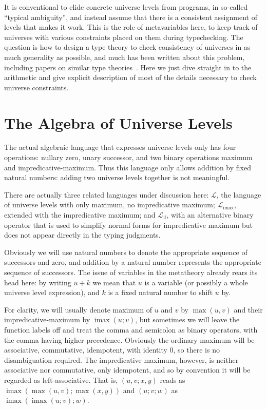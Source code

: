 \documentclass[11pt, twoside, reqno]{book}
\DeclareMathOperator{\imax}{imax}
\DeclareMathOperator{\ifop}{if}
\begin{document}
It is conventional to elide concrete universe levels from programs, in so-called ``typical ambiguity'', and instead assume that there is a consistent assignment of levels that makes it work.
This is the role of metavariables here, to keep track of universes with various constraints placed on them during typechecking.
The question is how to design a type theory to check consistency of universes in as much generality as possible, and much has been written about this problem, including papers on similar type theories~\cite{HARPER1991107}.
Here we just dive straight in to the arithmetic and give explicit description of most of the details necessary to check universe constraints.

\section{The Algebra of Universe Levels}
\label{alg-uni-lvl}

The actual algebraic language that expresses universe levels only has four operations: nullary zero, unary successor, and two binary operations maximum and impredicative-maximum.
Thus this language only allows addition by fixed natural numbers: adding two universe levels together is not meaningful.

There are actually three related languages under discussion here: \(\mathcal{L}\), the language of universe levels with only maximum, no impredicative maximum; \(\mathcal{L}_{\imax}\), extended with the impredicative maximum; and \(\mathcal{L}_{\ifop}\), with an alternative binary operator that is used to simplify normal forms for impredicative maximum but does not appear directly in the typing judgments.

Obviously we will use natural numbers to denote the appropriate sequence of successors and zero, and addition by a natural number represents the appropriate sequence of successors.
The issue of variables in the metatheory already rears its head here: by writing \(u+k\) we mean that \(u\) is a variable (or possibly a whole universe level expression), and \(k\) is a fixed natural number to shift \(u\) by.

For clarity, we will usually denote maximum of \(u\) and \(v\) by \(\max(u, v)\) and their impredicative-maximum by \(\imax(u; v)\), but sometimes we will leave the function labels off and treat the comma and semicolon as binary operators, with the comma having higher precedence.
Obviously the ordinary maximum will be associative, commutative, idempotent, with identity \(0\), so there is no disambiguation required.
The impredicative maximum, however, is neither associative nor commutative, only idempotent, and so by convention it will be regarded as left-associative.
That is, \((u, v; x, y)\) reads as \(\imax(\max(u, v); \max(x, y))\) and \((u; v; w)\) as \(\imax(\imax(u; v); w)\).
\end{document}
